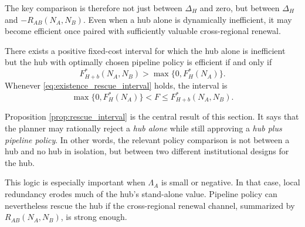 The key comparison is therefore not just between $\Delta_H$ and zero, but between $\Delta_H$ and $-R_{AB}(N_A,N_B)$. Even when a hub alone is dynamically inefficient, it may become efficient once paired with sufficiently valuable cross-regional renewal.

\begin{proposition}
\label{prop:rescue_interval}
There exists a positive fixed-cost interval for which the hub alone is inefficient but the hub with optimally chosen pipeline policy is efficient if and only if
\begin{equation}
F_{H+b}^*(N_A,N_B)>\max\{0,F_H^*(N_A)\}.
\label{eq:existence_rescue_interval}
\end{equation}
Whenever \eqref{eq:existence_rescue_interval} holds, the interval is
\begin{equation}
\max\{0,F_H^*(N_A)\}
<
F
\le
F_{H+b}^*(N_A,N_B).
\label{eq:rescue_interval}
\end{equation}
\end{proposition}

Proposition \ref{prop:rescue_interval} is the central result of this section. It says that the planner may rationally reject a \emph{hub alone} while still approving a \emph{hub plus pipeline policy}. In other words, the relevant policy comparison is not between a hub and no hub in isolation, but between two different institutional designs for the hub.

This logic is especially important when $\Lambda_A$ is small or negative. In that case, local redundancy erodes much of the hub's stand-alone value. Pipeline policy can nevertheless rescue the hub if the cross-regional renewal channel, summarized by $R_{AB}(N_A,N_B)$, is strong enough.

